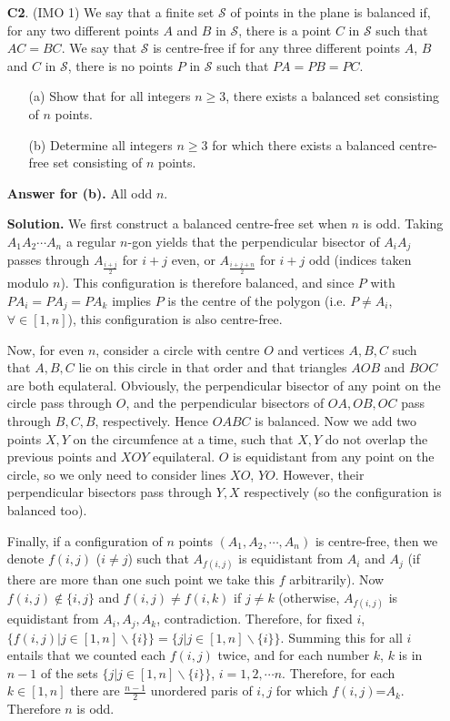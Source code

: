 \documentclass[11pt,a4paper]{article}
\begin{document}
\begin{enumerate}
\item[\textbf{C2}.] (IMO 1) We say that a finite set $\mathcal{S}$ of points in the plane is balanced if, for any two different points $A$ and $B$ in $\mathcal{S}$, there is a point $C$ in $\mathcal{S}$ such that $AC=BC$. We say that $\mathcal{S}$ is centre-free if for any three different points $A$, $B$ and $C$ in $\mathcal{S}$, there is no points $P$ in $\mathcal{S}$ such that $PA=PB=PC$.

\begin{enumerate}
	\item [(a)] Show that for all integers $n\ge 3$, there exists a balanced set consisting of $n$ points.
	
	\item [(b)] Determine all integers $n\ge 3$ for which there exists a balanced centre-free set consisting of $n$ points.
\end{enumerate}

\textbf{Answer for (b).} All odd $n$. 

\textbf{Solution.} We first construct a balanced centre-free set when $n$ is odd. 
Taking $A_1A_2\cdots A_n$ a regular $n$-gon yields that the perpendicular bisector of $A_iA_j$ passes through $A_\frac{i+j}{2}$ for $i+j$ even, or $A_\frac{i+j+n}{2}$ for $i+j$ odd (indices taken modulo $n$). This configuration is therefore balanced, and since $P$ with $PA_i=PA_j=PA_k$ implies $P$ is the centre of the polygon (i.e. $P\ne A_i$, $\forall\in[1,n]$), this configuration is also centre-free.

Now, for even $n$, consider a circle with centre $O$ and vertices $A,B,C$ such that $A,B,C$ lie on this circle in that order and that triangles $AOB$ and $BOC$ are both equlateral. Obviously, the perpendicular bisector of any point on the circle pass through $O$, and the perpendicular bisectors of $OA,OB,OC$ pass through $B,C,B$, respectively. Hence $OABC$ is balanced. Now we add two points $X, Y$ on the circumfence at a time, such that $X,Y$ do not overlap the previous points and $XOY$ equilateral. $O$ is equidistant from any point on the circle, so we only need to consider lines $XO$, $YO$. However, their perpendicular bisectors pass through $Y,X$ respectively (so the configuration is balanced too). 

Finally, if a configuration of $n$ points $(A_1, A_2,\cdots , A_n)$ is centre-free, then we denote $f(i,j)$ ($i\ne j$) such that $A_{f(i,j)}$ is equidistant from $A_i$ and $A_j$ (if there are more than one such point we take this $f$ arbitrarily). Now $f(i,j)\not\in\{i,j\}$ and $f(i,j)\ne f(i,k)$ if $j\ne k$ (otherwise, $A_{f(i,j)}$ is equidistant from $A_i, A_j, A_k$, contradiction. Therefore, for fixed $i$, $\{f(i,j)|j\in[1,n]\backslash \{i\}\}=\{j|j\in[1,n]\backslash \{i\}\}$. Summing this for all $i$ entails that we counted each $f(i,j)$ twice, and for each number $k$, $k$ is in $n-1$ of the sets $\{j|j\in[1,n]\backslash \{i\}\}$, $i=1,2,\cdots n$. Therefore, for each $k\in[1,n]$ there are $\frac{n-1}{2}$ unordered paris of $i,j$ for which $f(i,j)$=$A_k$. Therefore $n$ is odd. 


\end{enumerate}
\end{document}
